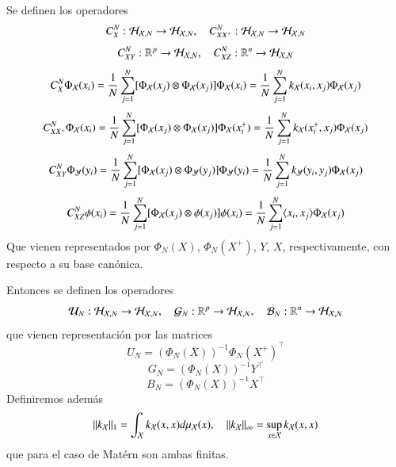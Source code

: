 	Se definen los operadores
	\begin{equation*}
		C_{X}^N : \mathcal{H}_{\mathcal{X}, N} \to \mathcal{H}_{\mathcal{X}, N}, \quad C_{XX^+}^N : \mathcal{H}_{\mathcal{X}, N} \to \mathcal{H}_{\mathcal{X}, N}
	\end{equation*}
	\begin{equation*}
		C_{XY}^N : \mathbb{R}^p \to \mathcal{H}_{\mathcal{X}, N}, \quad C_{XZ}^N : \mathbb{R}^n \to \mathcal{H}_{\mathcal{X}, N}
	\end{equation*}
	\begin{equation*}
		C_{X}^N \Phi_{\mathcal{X}} (x_i) = \frac{1}{N} \sum_{j = 1}^N [\Phi_{\mathcal{X}} (x_j) \otimes \Phi_{\mathcal{X}} (x_j)] \Phi_{\mathcal{X}} (x_i) = \frac{1}{N} \sum_{j = 1}^N k_{\mathcal{X}}(x_i, x_j) \Phi_{\mathcal{X}} (x_j)
	\end{equation*}
	\begin{equation*}
		C_{XX^+}^N \Phi_{\mathcal{X}} (x_i) = \frac{1}{N} \sum_{j = 1}^N [\Phi_{\mathcal{X}} (x_j) \otimes \Phi_{\mathcal{X}} (x_j)] \Phi_{\mathcal{X}} (x_i^+) = \frac{1}{N} \sum_{j = 1}^N k_{\mathcal{X}}(x_i^+, x_j) \Phi_{\mathcal{X}} (x_j)
	\end{equation*}
	\begin{equation*}
		C_{XY}^N \Phi_{\mathcal{Y}} (y_i) = \frac{1}{N} \sum_{j = 1}^N [\Phi_{\mathcal{X}} (x_j) \otimes \Phi_{\mathcal{Y}} (y_j)] \Phi_{\mathcal{Y}} (y_i) = \frac{1}{N} \sum_{j = 1}^N k_{\mathcal{Y}} (y_i, y_j) \Phi_{\mathcal{X}} (x_j)
	\end{equation*}
	\begin{equation*}
		C_{XZ}^N \phi (x_i) = \frac{1}{N} \sum_{j = 1}^N [\Phi_{\mathcal{X}} (x_j) \otimes \phi (x_j)] \phi (x_i) = \frac{1}{N} \sum_{j = 1}^N \langle x_i, x_j \rangle \Phi_{\mathcal{X}} (x_j)
	\end{equation*}
	Que vienen representados por $\Phi_N (X)$, $\Phi_N (X^+)$, $Y$, $X$, respectivamente, con respecto a su base canónica.

	Entonces se definen los operadores 
	\begin{equation*}
		\mathcal{U}_N : \mathcal{H}_{\mathcal{X}, N} \to \mathcal{H}_{\mathcal{X}, N}, \quad \mathcal{G}_N : \mathbb{R}^p \to \mathcal{H}_{\mathcal{X}, N}, \quad \mathcal{B}_N : \mathbb{R}^n \to \mathcal{H}_{\mathcal{X}, N}
	\end{equation*}
	que vienen representación por las matrices
	\begin{equation*}
		U_N = (\Phi_N (X))^{-1} \Phi_N (X^+)^\top
	\end{equation*}
	\begin{equation*}
		G_N = (\Phi_N (X))^{-1} Y^\top
	\end{equation*}
	\begin{equation*}
		B_N = (\Phi_N (X))^{-1} X^\top
	\end{equation*}
	Definiremos además
	\begin{equation*}
		\| k_{\mathcal{X}} \|_1 = \int_{\mathcal{X}} k_{\mathcal{X}} (x,x) d \mu_{\mathcal{X}} (x), \quad \| k_{\mathcal{X}} \|_\infty = \sup_{x \in \mathcal{X}} k_{\mathcal{X}} (x,x)
	\end{equation*}
	que para el caso de Matérn son ambas finitas.

